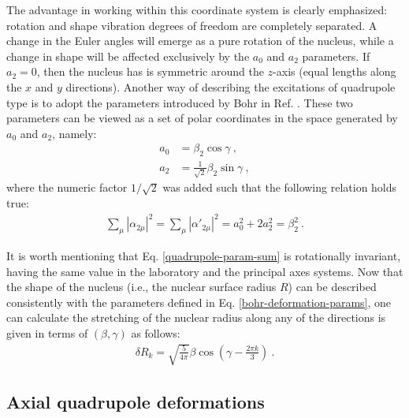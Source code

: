 The advantage in working within this coordinate system is clearly emphasized: rotation and shape vibration degrees of freedom are completely separated. A change in the Euler angles will emerge as a pure rotation of the nucleus, while a change in shape will be affected exclusively by the $a_0$ and $a_2$ parameters. If $a_2=0$, then the nucleus has is symmetric around the $z$-axis (equal lengths along the $x$ and $y$ directions). Another way of describing the excitations of quadrupole type is to adopt the parameters introduced by Bohr in Ref. \cite{bohr1954rotational}. These two parameters can be viewed as a set of polar coordinates in the space generated by $a_0$ and $a_2$, namely:
\begin{align}
    a_0&=\beta_2\cos\gamma\ , \nonumber \\
    a_2&=\frac{1}{\sqrt{2}}\beta_2\sin\gamma\ ,
    \label{bohr-deformation-params}
\end{align}
where the numeric factor $1/\sqrt{2}$ was added such that the following relation holds true:
\begin{align}
    \sum_\mu\left|\alpha_{2\mu}\right|^2=\sum_\mu\left|\alpha'_{2\mu}\right|^2=a_0^2+2a_2^2=\beta_2^2\ .
    \label{quadrupole-param-sum}
\end{align}

It is worth mentioning that Eq. \eqref{quadrupole-param-sum} is rotationally invariant, having the same value in the laboratory and the principal axes systems. Now that the shape of the nucleus (i.e., the nuclear surface radius $R$) can be described consistently with the parameters defined in Eq. \eqref{bohr-deformation-params}, one can calculate the stretching of the nuclear radius along any of the directions is given in terms of $(\beta,\gamma)$ as follows:
\begin{align}
    \delta R_k=\sqrt{\frac{5}{4\pi}}\beta\cos(\gamma-\frac{2\pi k}{3})\ .
    \label{axes-stretching}
\end{align}

\subsection{Axial quadrupole deformations}

